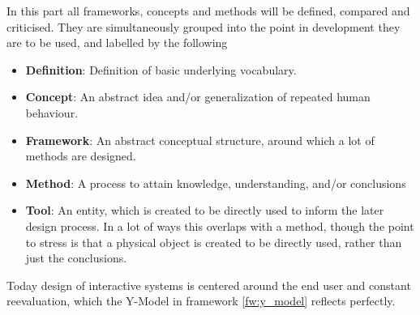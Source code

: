 In this part all frameworks, concepts and methods will be defined, compared and criticised. They are simultaneously grouped into the point in development they are to be used, and labelled by the following
\begin{itemize}
   \item \textbf{Definition}: Definition of basic underlying vocabulary.

   \item \textbf{Concept}: An abstract idea and/or generalization of repeated human behaviour.

   \item \textbf{Framework}: An abstract conceptual structure, around which a lot of methods are designed.
  
   \item \textbf{Method}: A process to attain knowledge, understanding, and/or conclusions
  
   \item \textbf{Tool}: An entity, which is created to be directly used to inform the later design process. In a lot of ways this overlaps with a method, though the point to stress is that a physical object is created to be directly used, rather than just the conclusions.
\end{itemize}

Today design of interactive systems is centered around the end user and constant reevaluation, which the Y-Model in framework \ref{fw:y_model} reflects perfectly. 
